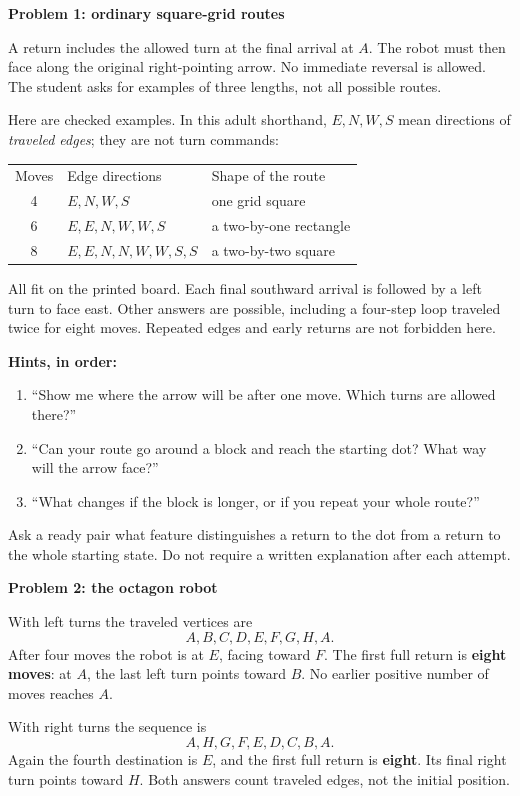 \documentclass[11pt]{article}
\newcommand{\topic}[1]{\vspace{4pt}{\large\bfseries #1}\par}
\newcommand{\sub}[1]{{\bfseries #1}\par}
\begin{document}
\topic{Problems 1--2: walking and turning}
\sub{Problem 1: ordinary square-grid routes}
A return includes the allowed turn at the final arrival at \(A\). The robot must then face along the original right-pointing arrow. No immediate reversal is allowed. The student asks for examples of three lengths, not all possible routes.

Here are checked examples. In this adult shorthand, \(E,N,W,S\) mean directions of \emph{traveled edges}; they are not turn commands:
\begin{center}
\begin{tabular}{cll}
Moves & Edge directions & Shape of the route \\
4 & \(E,N,W,S\) & one grid square \\
6 & \(E,E,N,W,W,S\) & a two-by-one rectangle \\
8 & \(E,E,N,N,W,W,S,S\) & a two-by-two square
\end{tabular}
\end{center}
All fit on the printed board. Each final southward arrival is followed by a left turn to face east. Other answers are possible, including a four-step loop traveled twice for eight moves. Repeated edges and early returns are not forbidden here.

\textbf{Hints, in order:}
\begin{enumerate}
\item ``Show me where the arrow will be after one move. Which turns are allowed there?''
\item ``Can your route go around a block and reach the starting dot? What way will the arrow face?''
\item ``What changes if the block is longer, or if you repeat your whole route?''
\end{enumerate}
Ask a ready pair what feature distinguishes a return to the dot from a return to the whole starting state. Do not require a written explanation after each attempt.

\sub{Problem 2: the octagon robot}
With left turns the traveled vertices are
\[A,B,C,D,E,F,G,H,A.\]
After four moves the robot is at \(E\), facing toward \(F\). The first full return is \textbf{eight moves}: at \(A\), the last left turn points toward \(B\). No earlier positive number of moves reaches \(A\).

With right turns the sequence is
\[A,H,G,F,E,D,C,B,A.\]
Again the fourth destination is \(E\), and the first full return is \textbf{eight}. Its final right turn points toward \(H\). Both answers count traveled edges, not the initial position.
\end{document}
